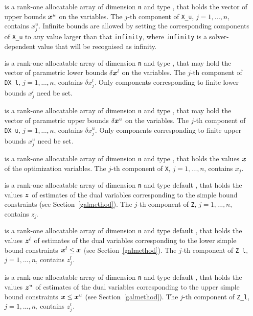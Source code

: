 \documentclass{galahad}
\begin{document}
\begin{description}
 is a rank-one allocatable array of dimension {\tt n} and type 
\realdp, that holds
the vector of upper bounds ${\bm{x}}^{u}$ on the variables.
The $j$-th component of {\tt X\_u}, $j = 1, \ldots , n$, 
contains $x_{j}^{u}$.
Infinite bounds are allowed by setting the corresponding 
components of {\tt X\_u} to any value larger than that {\tt infinity}, 
where {\tt infinity} is a  solver-dependent value that will be recognised as
infinity.

 is a rank-one allocatable array of dimension {\tt n} and type 
\realdp, that may hold the vector of parametric lower bounds 
$\delta {\bm{x}}^{l}$ on the variables. The $j$-th component of 
{\tt DX\_l}, $j = 1, \ldots , n$, contains $\delta x_{j}^{l}$.
Only components corresponding to finite lower bounds $x_{j}^{l}$
need be set.

 is a rank-one allocatable array of dimension {\tt n} and type 
\realdp, that may hold the vector of parametric upper bounds 
$\delta {\bm{x}}^{u}$  on the variables. The $j$-th component of 
{\tt DX\_u}, $j = 1,  \ldots ,  n$, contains $\delta x_{j}^{u}$.
Only components corresponding to finite upper bounds $x_{j}^{u}$
need be set.

 is a rank-one allocatable array of dimension {\tt n} and type 
\realdp, 
that holds the values ${\bm{x}}$ of the optimization variables.
The $j$-th component of {\tt X}, $j = 1,  \ldots , n$, contains $x_{j}$.  

 is a rank-one allocatable array of dimension {\tt n} and type default 
\realdp, that holds
the values ${\bm{z}}$ of estimates  of the dual variables 
corresponding to the simple bound constraints (see Section~\ref{galmethod}).
The $j$-th component of {\tt Z}, $j = 1,  \ldots ,  n$, contains $z_{j}$.  

 is a rank-one allocatable array of dimension {\tt n} and type default 
\realdp, that holds
the values ${\bm{z}}^{l}$ of estimates  of the dual variables 
corresponding to the lower simple bound constraints ${\bm{x}}^{l} \leq {\bm{x}}$
(see Section~\ref{galmethod}).
The $j$-th component of {\tt Z\_l}, $j = 1,  \ldots ,  n$, 
contains $z_{j}^{l}$.  

 is a rank-one allocatable array of dimension {\tt n} and type default 
\realdp, that holds
the values ${\bm{z}}^{u}$ of estimates  of the dual variables 
corresponding to the upper simple bound constraints ${\bm{x}} \leq {\bm{x}}^{u}$
(see Section~\ref{galmethod}).
The $j$-th component of {\tt Z\_l}, $j = 1,  \ldots ,  n$, 
contains $z_{j}^{l}$.  


\end{description}
\end{document}
